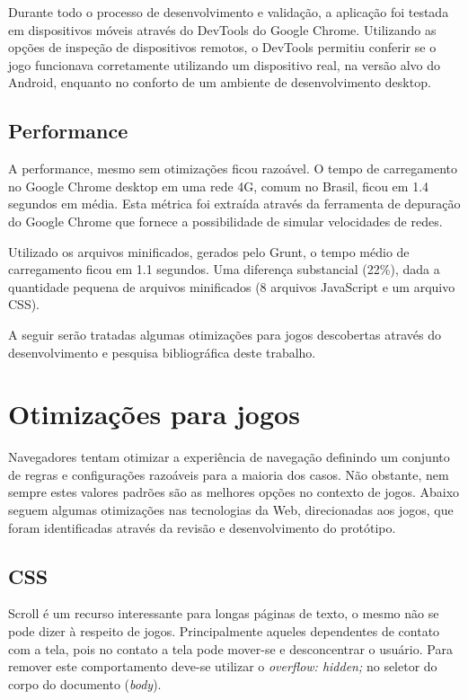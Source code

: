 Durante todo o processo de desenvolvimento e validação, a aplicação
foi testada em dispositivos móveis através do DevTools do Google
Chrome. Utilizando as opções de inspeção de dispositivos remotos, o
DevTools permitiu conferir se o jogo funcionava corretamente utilizando
um dispositivo real, na versão alvo do Android, enquanto no conforto de
um ambiente de desenvolvimento desktop.


\subsection{Performance}

A performance, mesmo sem otimizações ficou razoável. O tempo de
carregamento no Google Chrome desktop em uma rede 4G, comum no Brasil,
ficou em 1.4 segundos em média. Esta métrica foi extraída através da
ferramenta de depuração do Google Chrome que fornece a possibilidade
de simular velocidades de redes.

Utilizado os arquivos minificados, gerados pelo Grunt, o tempo médio
de carregamento ficou em 1.1 segundos. Uma diferença substancial (22\%), dada a
quantidade pequena de arquivos minificados (8 arquivos JavaScript e um
arquivo CSS).

A seguir serão tratadas algumas otimizações para jogos descobertas
através do desenvolvimento e pesquisa bibliográfica deste trabalho.

\section{Otimizações para jogos} \label{optimizations}
Navegadores tentam otimizar a experiência de navegação definindo
um conjunto de regras e configurações razoáveis para a maioria dos
casos. Não obstante, nem sempre estes valores padrões são as melhores
opções no contexto de jogos. Abaixo seguem algumas otimizações
nas tecnologias da Web, direcionadas aos jogos, que foram identificadas
através da revisão e desenvolvimento do protótipo.

\subsection{CSS}

Scroll é um recurso interessante para longas páginas de texto,
o mesmo não se pode dizer à respeito de jogos.
Principalmente aqueles dependentes de contato com a tela, pois
no contato a tela pode mover-se e desconcentrar o usuário. Para
remover este comportamento deve-se utilizar o \textit{overflow:
hidden;} no seletor do corpo do documento (\textit{body}).

